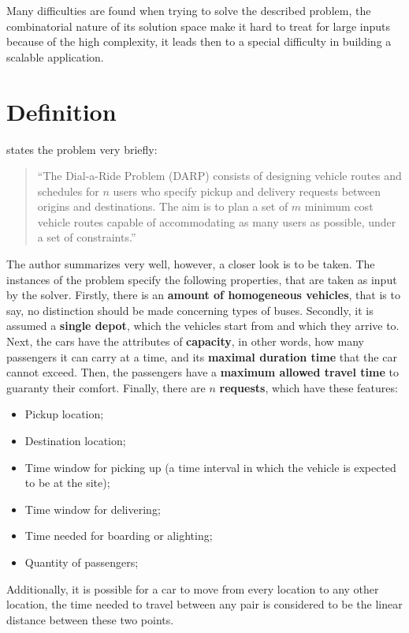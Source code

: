 \documentclass[tuberlin,cic,tc,openright,english,noabntcite,oneside]{iiufrgs}
\begin{document}
Many difficulties are found when trying to solve the described problem, the combinatorial nature of its solution space make it hard to treat for large inputs because of the high complexity, it leads then to a special difficulty in building a scalable application.

\section{Definition}

\textcite[p. 29]{cordeau_dial--ride_2007} states the problem very briefly:
\begin{quote}
\enquote{The Dial-a-Ride Problem (DARP) consists of designing vehicle routes and schedules for $n$ users who specify pickup and delivery requests between origins and destinations. The aim is to plan a set of $m$ minimum cost vehicle routes capable of accommodating as many users as possible, under a set of constraints.}
\end{quote}

The author summarizes very well, however, a closer look is to be taken. The instances of the problem specify the following properties, that are taken as input by the solver. Firstly, there is an \textbf{amount of homogeneous vehicles}, that is to say, no distinction should be made concerning types of buses. Secondly, it is assumed a \textbf{single depot}, which the vehicles start from and which they arrive to. Next, the cars have the attributes of \textbf{capacity}, in other words, how many passengers it can carry at a time, and its \textbf{maximal duration time} that the car cannot exceed. Then, the passengers have a \textbf{maximum allowed travel time} to guaranty their comfort. Finally, there are $n$ \textbf{requests}, which have these features:

\begin{itemize}
\item Pickup location;
\item Destination location;
\item Time window for picking up (a time interval in which the vehicle is expected to be at the site);
\item Time window for delivering;
\item Time needed for boarding or alighting;
\item Quantity of passengers;
\end{itemize}

Additionally, it is possible for a car to move from every location to any other location, the time needed to travel between any pair is considered to be the linear distance between these two points.
\end{document}
